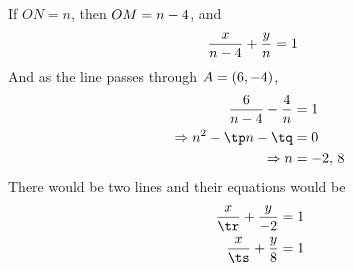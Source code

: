 \gcalcexpr[0]\tp{\vbone - \vbtwo + \vbthree} 
\gcalcexpr[0]\tq{\vbtwo * \vbthree}
\gcalcexpr[0]\tr{\vbfour - \vbthree} %
\gcalcexpr[0]\ts{\vbfive - \vbthree} %

\begin{solution}[\halfpage]
	If $ON = n$, then $OM = n - 4$, and 
	\begin{align}
		\dfrac{x}{n-4} + \dfrac{y}{n} &= 1
	\end{align}
	And as the line passes through $A = (6, -4)$, 
	\begin{align}
		\dfrac{\vbone}{n-\vbthree}-\dfrac{\vbtwo}{n} &= 1 \\
		\Rightarrow n^2 - \tp n - \tq &= 0 \\
		\Rightarrow n &= \vbfour,\, \vbfive
	\end{align}
	There would be two lines and their equations would be 
	\begin{align}
		\dfrac{x}{\tr} + \dfrac{y}{\vbfour} &= 1 \\
		\dfrac{x}{\ts} + \dfrac{y}{\vbfive} &= 1
	\end{align}
\end{solution}

